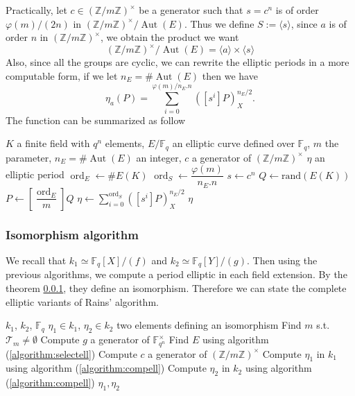 \documentclass[12pt]{article}
\theoremstyle{plain}
\theoremstyle{definition}
\DeclareMathOperator{\order}{ord} %
\DeclareMathOperator{\Aut}{Aut}
\def\Z{\ensuremath{\mathbb{Z}}}
\def\F{\ensuremath{\mathbb{F}}}
\newcounter{algorithm}
\begin{document}
Practically, let $c\in(\Z/m\Z)^{\times}$ be a generator such that $s = c^n$ is 
of order $\varphi(m)/(2n)$ in $(\Z/m\Z)^{\times}/\Aut(E)$. Thus we define $S 
:= \langle{s}\rangle$, since $a$ is of order $n$ in $(\Z/m\Z)^{\times}$, we 
obtain the product we want
\[
(\Z/m\Z)^{\times}/\Aut(E) = \langle{a}\rangle\times\langle{s}\rangle
\]
Also, since all the groups are cyclic, we can rewrite the elliptic periods in a
more computable form, if we let $n_E = \#\Aut(E)$ then we have
\begin{equation}
\eta_a(P) = \sum_{i = 0}^{\varphi(m)/n_E.n}{\left([s^i]P\right)_X^{n_E/2}}.
\end{equation}
The function can be summarized as follow

\begin{algorithm}
\label{algorithm:compell}
    \begin{algorithmic}[1]
    \REQUIRE $K$ a finite field with $q^n$ elements, $E/\F_q$ an elliptic curve
defined over $\F_q$, $m$ the parameter, $n_E = \#\Aut(E)$ an integer, $c$ a 
generator of $(\Z/m\Z)^{\times}$
    \ENSURE $\eta$ an elliptic period
    \STATE $\order_E\leftarrow\#E(K)$
    \STATE $\order_S \leftarrow \dfrac{\varphi(m)}{n_E.n}$
    \STATE $s \leftarrow c^n$
    \REPEAT
        \STATE $Q\leftarrow\text{rand}(E(K))$
        \STATE $P\leftarrow[\dfrac{\order_E}{m}]Q$
    \STATE $\eta\leftarrow\sum_{i=0}^{\order_S}{\left([s^i]P\right)_X^{n_E/2}}$
    \RETURN $\eta$
    \end{algorithmic}
\end{algorithm}

\subsubsection{Isomorphism algorithm}

We recall that $k_1\simeq\F_q[X]/(f)$ and $k_2\simeq\F_q[Y]/(g)$. Then using the
previous algorithms, we compute a period elliptic in each field extension. By
the theorem \ref{}, they define an isomorphism. Therefore we can state the
complete elliptic variants of Rains' algorithm.

\begin{algorithm}
\label{algorithm:rainsell}
    \begin{algorithmic}[1]
    \REQUIRE $k_1$, $k_2$, $\F_q$
    \ENSURE $\eta_1\in k_1$, $\eta_2\in k_2$ two elements defining an
isomorphism
    \STATE Find $m$ s.t. $\mathcal{T}_m\neq\emptyset$
    \STATE Compute $g$ a generator of $\F_{q^n}^{\times}$
    \STATE Find $E$ using algorithm (\ref{algorithm:selectell})
    \STATE Compute $c$ a generator of $(\Z/m\Z)^{\times}$
    \STATE Compute $\eta_1$ in $k_1$ using algorithm (\ref{algorithm:compell})
    \STATE Compute $\eta_2$ in $k_2$ using algorithm (\ref{algorithm:compell})
    \RETURN $\eta_1, \eta_2$
    \end{algorithmic}
\end{algorithm}
\end{document}
